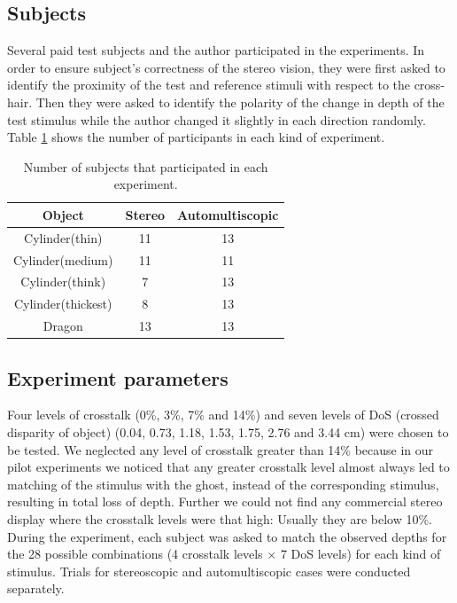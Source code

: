 \subsection{Subjects}
Several paid test subjects and the author participated in the experiments. In order to ensure subject's correctness of the stereo vision, they were first asked to identify the proximity of the test and reference stimuli with respect to the cross-hair. Then they were asked to identify the polarity of the change in depth of the test stimulus while the author changed it slightly in each direction randomly. Table \ref{tab:agg_subj} shows the number of participants in each kind of experiment.
\begin{table}[ht!]
  \begin{center}
    \caption{Number of subjects that participated in each experiment.}
    \label{tab:agg_subj}
    \begin{tabular}{ccc}
      \toprule
      Object & Stereo  & Automultiscopic\\
      \midrule
      Cylinder(thin) & 11 & 13  \\
      Cylinder(medium) & 11 & 11\\
      Cylinder(think) & 7 & 13\\
      Cylinder(thickest) & 8 & 13 \\
      Dragon & 13 & 13\\
      \bottomrule
    \end{tabular}
  \end{center}
\end{table}

\subsection{Experiment parameters}
Four levels of crosstalk (0\%, 3\%, 7\% and 14\%) and seven levels of DoS (crossed disparity of object) (0.04, 0.73, 1.18, 1.53, 1.75, 2.76 and 3.44 cm) were chosen to be tested. We neglected any level of crosstalk greater than 14\% because in our pilot experiments we noticed that any greater crosstalk level almost always led to matching of the stimulus with the ghost, instead of the corresponding stimulus, resulting in total loss of depth. Further we could not find any commercial stereo display where the crosstalk levels were that high: Usually they are below 10\%. During the experiment, each subject was asked to match the observed depths for the 28 possible combinations (4 crosstalk levels $\times$ 7 DoS levels) for each kind of stimulus. Trials for stereoscopic and automultiscopic cases were conducted separately.
\\
